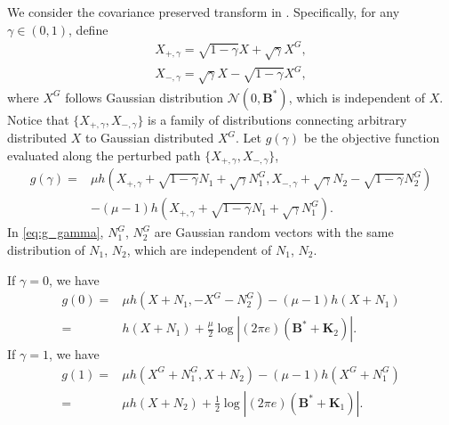 \documentclass[journal,final, onecolumn]{IEEEtran}
\begin{document}
We consider the {covariance preserved transform} in \cite{DCT91}. Specifically, for any $\gamma \in (0,1)$, define
\begin{align}
X_{+,\gamma} =\sqrt{1-\gamma}X + \sqrt{\gamma}X^{G}, \label{eq:trans1}\\
X_{-,\gamma} =\sqrt{\gamma}X - \sqrt{1-\gamma}X^{G}, \label{eq:trans2}
\end{align}
where $X^{G}$ follows Gaussian distribution $\mathcal{N}(0, \boldsymbol{B}^{*})$, which is independent of $X$. Notice that $\{X_{+,\gamma}, X_{-,\gamma}\}$ is a family of distributions connecting arbitrary distributed $X$ to Gaussian distributed $X^{G}$. Let $g(\gamma)$ be the objective function evaluated along the perturbed path $\{X_{+,\gamma}, X_{-,\gamma}\}$,
\begin{align}
g(\gamma) =&  \mu h\left(X_{+,\gamma}+\sqrt{1-\gamma}N_{1} + \sqrt{\gamma} N^{G}_{1},X_{-,\gamma}+ \sqrt{\gamma}N_{2}
- \sqrt{1-\gamma}N^{G}_{2}\right) \nonumber \\
&-(\mu-1) h \left(  X_{+,\gamma}+\sqrt{1-\gamma}N_{1} + \sqrt{\gamma} N^{G}_{1}        \right). \label{eq:g_gamma}
\end{align}
In \eqref{eq:g_gamma}, $N_{1}^{G}$, $N_{2}^{G}$ are Gaussian random vectors with the same distribution of $N_1$, $N_2$, which are independent of $N_1$, $N_2$.

If $\gamma =0$, we have
\begin{align}
g(0) = & \mu h(X + {N}_{1}, -X^{G} - {N}^{G}_{2})- (\mu-1) h(X+{N}_{1})  \\
     = & h(X+{N}_{1}) + \frac{\mu}{2} \log \left|  (2 \pi e)\left( \boldsymbol{B}^{*} + \boldsymbol{K}_{2}   \right)       \right|.
\end{align}
If $\gamma =1$, we have
\begin{align}
g(1) = & \mu h(X^{G}+N^{G}_{1},X+N_2)-(\mu-1)h(X^{G} + N^{G}_{1}) \\
     = & \mu h(X+N_{2}) + \frac{1}{2}\log \left|  (2 \pi e)\left( \boldsymbol{B}^{*} + \boldsymbol{K}_{1}   \right)       \right|.
\end{align}
\end{document}
